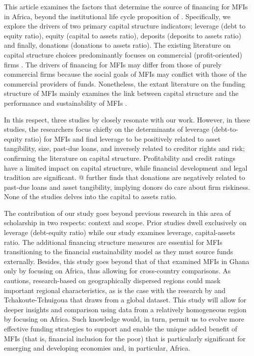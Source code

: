 \documentclass[a4paper, nobind]{templates/ociamthesis}
\begin{document}
This article examines the factors that determine the source of financing for MFIs in Africa, beyond the institutional life cycle proposition of \textcite{bayai2016financing}. Specifically, we explore the drivers of two primary capital structure indicators; leverage (debt to equity ratio), equity (capital to assets ratio), deposits (deposits to assets ratio) and finally, donations (donations to assets ratio). The existing literature on capital structure choices predominantly focuses on commercial (profit-oriented) firms \autocite{gropp2010determinants,liu2017optimal,matias2017there}. The drivers of financing for MFIs may differ from those of purely commercial firms because the social goals of MFIs may conflict with those of the commercial providers of funds. Nonetheless, the extant literature on the funding structure of MFIs mainly examines the link between capital structure and the performance and sustainability of MFIs \autocite{kyereboah2007determinants,khachatryan2017performance}.

In this respect, three studies by \autocite{kyereboah2007determinants,tchuigoua2014institutional,tchuigoua2015capital} closely resonate with our work. However, in these studies, the researchers focus chiefly on the determinants of leverage (debt-to-equity ratio) for MFIs and find leverage to be positively related to asset tangibility, size, past-due loans, and inversely related to creditor rights and risk; confirming the literature on capital structure. Profitability and credit ratings have a limited impact on capital structure, while financial development and legal tradition are significant. @\textcite{tchuigoua2014institutional} further finds that donations are negatively related to past-due loans and asset tangibility, implying donors do care about firm riskiness. None of the studies delves into the capital to assets ratio.

The contribution of our study goes beyond previous research in this area of scholarship in two respects: context and scope. Prior studies dwell exclusively on leverage (debt-equity ratio) while our study examines leverage, capital-assets ratio. The additional financing structure measures are essential for MFIs transitioning to the financial sustainability model as they must source funds externally. Besides, this study goes beyond that of \textcite{kyereboah2007determinants} that examined MFIs in Ghana only by focusing on Africa, thus allowing for cross-country comparisons. As \textcite{d2017ngos} cautions, research-based on geographically dispersed regions could mask important regional characteristics, as is the case with the research by \textcite{tchuigoua2014institutional} and \textcite{tchuigoua2015capital} Tchakoute-Tchuigoua that draws from a global dataset. This study will allow for deeper insights and comparison using data from a relatively homogeneous region by focusing on Africa. Such knowledge would, in turn, permit us to evolve more effective funding strategies to support and enable the unique added benefit of MFIs (that is, financial inclusion for the poor) that is particularly significant for emerging and developing economies and, in particular, Africa.
\end{document}
